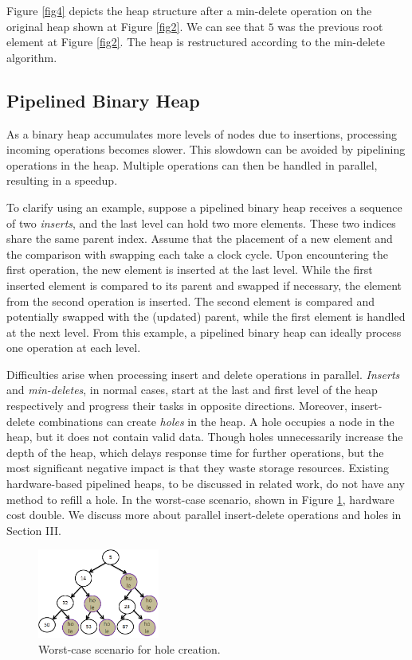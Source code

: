 Figure \ref{fig4} depicts the heap structure after a min-delete operation on the original heap shown at Figure \ref{fig2}.
We can see that $5$ was the previous root element at Figure \ref{fig2}.
The heap is restructured according to the min-delete algorithm.

\subsection{Pipelined Binary Heap}
As a binary heap accumulates more levels of nodes due to insertions, processing incoming operations becomes slower.
This slowdown can be avoided by pipelining operations in the heap.
Multiple operations can then be handled in parallel, resulting in a speedup.

To clarify using an example, suppose a pipelined binary heap receives a sequence of two {\it inserts}, and the last level can hold two more elements.
These two indices share the same parent index.
Assume that the placement of a new element and the comparison with swapping each take a clock cycle.
Upon encountering the first operation, the new element is inserted at the last level.
While the first inserted element is compared to its parent and swapped if necessary, the element from the second operation is inserted.
The second element is compared and potentially swapped with the (updated) parent, while the first element is handled at the next level.
From this example, a pipelined binary heap can ideally process one operation at each level.

Difficulties arise when processing insert and delete operations in parallel.
{\it Inserts} and {\it min-deletes}, in normal cases, start at the last and first level of the heap respectively and progress their tasks in opposite directions.
Moreover, insert-delete combinations can create {\it holes} in the heap. 
A hole occupies a node in the heap, but it does not contain valid data.
Though holes unnecessarily increase the depth of the heap, which delays response time for further operations, but the most significant negative impact is that they waste storage resources.
Existing hardware-based pipelined heaps, to be discussed in related work, do not have any method to refill a hole.
In the worst-case scenario, shown in Figure \ref{hole}, hardware cost double. 
We discuss more about parallel insert-delete operations and holes in Section III.

\begin{figure}[!ht]
  \centering
  \includegraphics[width=4cm]{fig/hole.png}
      \caption{Worst-case scenario for hole creation.}
    \label{hole}
\end{figure}

